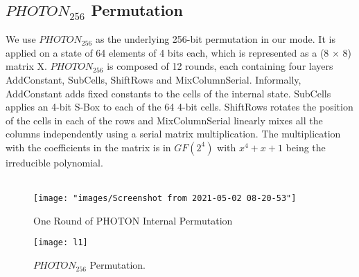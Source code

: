 \documentclass{article}
\begin{document}
\subsection{\textbf{$PHOTON_{256}$} Permutation}
We use $PHOTON_{256}$ as the underlying 256-bit permutation in our mode. It is applied on a state of 64 elements of 4 bits each, which is represented as a (8 $\times$ 8) matrix X. $PHOTON_{256}$ is composed of 12 rounds, each containing four layers AddConstant, SubCells, ShiftRows and MixColumnSerial. Informally, AddConstant
adds fixed constants to the cells of the internal state. SubCells applies an 4-bit S-Box to each of the 64 4-bit cells. ShiftRows rotates the position of the cells in each of the rows and MixColumnSerial linearly mixes all the columns independently using a serial matrix multiplication. The multiplication with the coefficients in the matrix is in $GF (2^4)$ with $x^4 + x + 1$ being the irreducible polynomial.\\\\
\begin{figure}
	\centering
	\texttt{[image: "images/Screenshot from 2021-05-02 08-20-53"]}
	\caption{One Round of PHOTON Internal Permutation}
	\label{fig:screenshot-from-2021-05-02-08-20-53}
\end{figure}
\begin{figure}
	\centering
	\texttt{[image: l1]}
	\caption{$PHOTON_{256}$ Permutation.}
	\label{fig:l1}
\end{figure}
\end{document}
